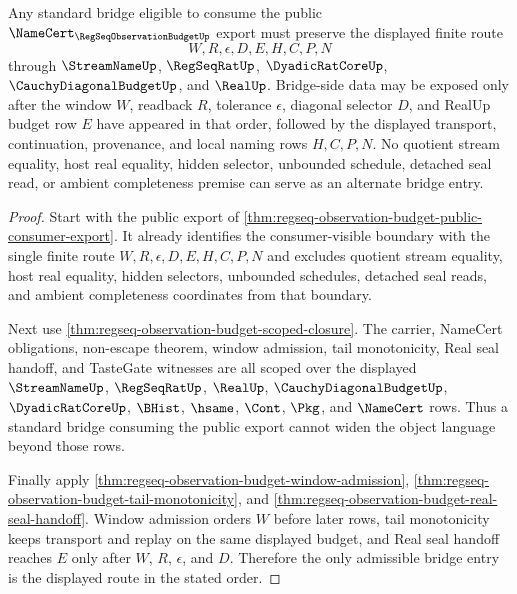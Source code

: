 \begin{theorem}\label{thm:regseq-observation-budget-bridge-precondition}
Any standard bridge eligible to consume the public $\NameCert_{\RegSeqObservationBudgetUp}$ export must preserve the displayed finite route
$$
W,R,\epsilon,D,E,H,C,P,N
$$
through $\StreamNameUp$, $\RegSeqRatUp$, $\DyadicRatCoreUp$, $\CauchyDiagonalBudgetUp$, and $\RealUp$. Bridge-side data may be exposed only after the window $W$, readback $R$, tolerance $\epsilon$, diagonal selector $D$, and RealUp budget row $E$ have appeared in that order, followed by the displayed transport, continuation, provenance, and local naming rows $H,C,P,N$. No quotient stream equality, host real equality, hidden selector, unbounded schedule, detached seal read, or ambient completeness premise can serve as an alternate bridge entry.
\end{theorem}
\begin{proof}
Start with the public export of \autoref{thm:regseq-observation-budget-public-consumer-export}. It already identifies the consumer-visible boundary with the single finite route $W,R,\epsilon,D,E,H,C,P,N$ and excludes quotient stream equality, host real equality, hidden selectors, unbounded schedules, detached seal reads, and ambient completeness coordinates from that boundary.

Next use \autoref{thm:regseq-observation-budget-scoped-closure}. The carrier, NameCert obligations, non-escape theorem, window admission, tail monotonicity, Real seal handoff, and TasteGate witnesses are all scoped over the displayed $\StreamNameUp$, $\RegSeqRatUp$, $\RealUp$, $\CauchyDiagonalBudgetUp$, $\DyadicRatCoreUp$, $\BHist$, $\hsame$, $\Cont$, $\Pkg$, and $\NameCert$ rows. Thus a standard bridge consuming the public export cannot widen the object language beyond those rows.

Finally apply \autoref{thm:regseq-observation-budget-window-admission}, \autoref{thm:regseq-observation-budget-tail-monotonicity}, and \autoref{thm:regseq-observation-budget-real-seal-handoff}. Window admission orders $W$ before later rows, tail monotonicity keeps transport and replay on the same displayed budget, and Real seal handoff reaches $E$ only after $W$, $R$, $\epsilon$, and $D$. Therefore the only admissible bridge entry is the displayed route in the stated order.
\end{proof}

